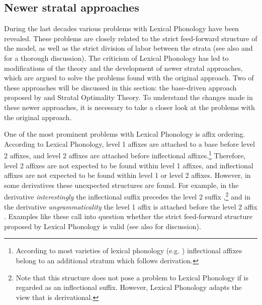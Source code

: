 \subsection{Newer stratal approaches}

During the last decades various problems with Lexical Phonology have been revealed. These problems are closely related to the strict feed-forward structure of the model, as well as the strict division of labor between the strata (see also \citet[chapter 2]{Giegerich.1999} and \citet[chapter 7]{Plag.2003} for a thorough discussion). The criticism of Lexical Phonology has led to modifications of the theory and the development of newer stratal approaches, which are argued to solve the problems found with the original approach. Two of these approaches will be discussed in this section: the base-driven approach proposed by \cite{Giegerich.1999} and Stratal Optimality Theory. To understand the changes made in these newer approaches, it is necessary to take a closer look at the problems with the original approach.

One of the most prominent problems with Lexical Phonology is affix ordering. According to Lexical Phonology, level 1 affixes are attached to a base before level 2 affixes, and level 2 affixes are attached before inflectional affixes.\footnote{According to most varieties of lexical phonology (e.g.  \citealt{Kiparsky.1982,Mohanan.1986}) inflectional affixes belong to an additional stratum which follows derivation.} Therefore, level 2 affixes are not expected to be found within level 1 affixes, and inflectional affixes are not expected to be found within level 1 or level 2 affixes. However, in some derivatives these unexpected structures are found. For example, in the derivative \textit{interestingly} the inflectional suffix  precedes the level 2 suffix ,\footnote{Note that this structure does not pose a problem to Lexical Phonology if  is regarded as an inflectional suffix. However, Lexical Phonology adapts the view that  is derivational. } and in the derivative \textit{ungrammaticality} the level 1 affix  is attached before the level 2 affix . Examples like these call into question whether the strict feed-forward structure proposed by Lexical Phonology is valid (see also \citet[chapter 4]{Plag.1999} for discussion).

